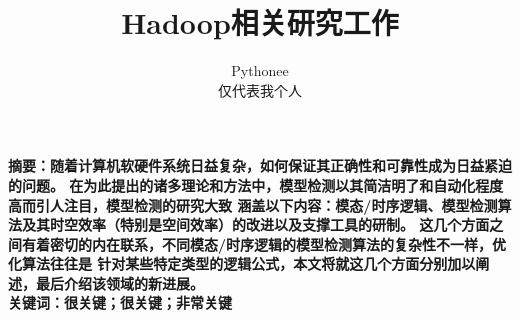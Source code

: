 \documentclass[a4paper,10pt,adobefonts]{ctexart}
\begin{document}
\title{\bfseries{Hadoop相关研究工作}}
\author{{Pythonee}\\[8pt]
 仅代表我个人 \\[4pt]
}
\date{}  %

\maketitle
\pagestyle{plain}
\thispagestyle{empty}
\vspace{-20pt}


\begin{center}
\parbox{\textwidth}{
\bfseries{摘要：}\rm{随着计算机软硬件系统日益复杂，如何保证其正确性和可靠性成为日益紧迫的问题。
在为此提出的诸多理论和方法中，模型检测以其简洁明了和自动化程度高而引人注目，模型检测的研究大致
涵盖以下内容：模态/时序逻辑、模型检测算法及其时空效率（特别是空间效率）的改进以及支撑工具的研制。
这几个方面之间有着密切的内在联系，不同模态/时序逻辑的模型检测算法的复杂性不一样，优化算法往往是
针对某些特定类型的逻辑公式，本文将就这几个方面分别加以阐述，最后介绍该领域的新进展。}\\[5pt]
\bfseries{关键词：}\rm{很关键；很关键；非常关键}
\\[5pt]
}
\end{center}

\begin{comment}
\begin{center}
\zihao{4}{\textbf{Understanding counterexamples using Craig Interpolation}}\\[7pt]
\normalsize
Wang Fei\\[7pt]
\zihao{-5} College of Computer Science and Technology\\
Harbin Engineering University, Heilongjiang Harbin 150001\\[10pt]
\end{center}
\begin{center}
\parbox{\textwidth}{
\textbf{Abstract:} Model checking is an automatic technique for verifying finite-state reactive systems, such as sequential circuit designs and communication protocols. Specifications are expressed in temporal logic, and the reactive system is modeled as a state-transition graph. An efficient search procedure is used to determine whether or not the state-transition graph satisfies the specifications.
We describe the basic model checking algorithm and show how it can be used with binary decision diagrams to verify properties of large state-transition graphs. We illustrate the power of model checking to find subtle errors by verifying part of the Contingency Guidance Requirements for the Space Shuttle.\\[4pt]
\textbf{Keywords:} Key; Key; the Key
}
\end{center}
\end{comment}
\end{document}
